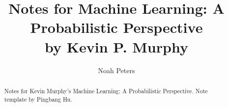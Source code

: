 \documentclass[a4paper]{report}
\author{Noah Peters}
\title{Notes for Machine Learning: A Probabilistic Perspective \\ by Kevin P. Murphy}
\begin{document}
\maketitle

\begin{abstract}
	Notes for Kevin Murphy's Machine Learning: A Probabilistic Perspective. Note template by Pingbang Hu.
\end{abstract}

\newpage

\tableofcontents


\newpage
\appendix
\appendixpage



\newpage
\printbibliography
\end{document}
